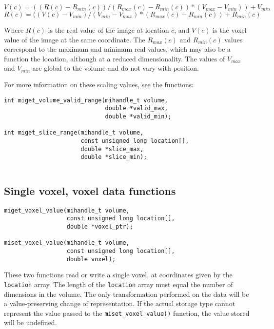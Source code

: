 \documentclass{article}
\begin{document}
\begin{equation}
V(c) = ((R(c) - R_{min}(c)) / (R_{max}(c)-R_{min}(c)) * (V_{max} - V_{min})) + V_{min}
\end{equation}
\begin{equation}
R(c) = ((V(c) - V_{min}) / (V_{min} - V_{max}) * (R_{max}(c) - R_{min}(c)) + R_{min}(c)
\end{equation}

Where $R(c)$ is the real value of the image at location $c$, and
$V(c)$ is the voxel value of the image at the same coordinate.  The
$R_{max}(c)$ and $R_{min}(c)$ values correspond to the maximum and
minimum real values, which may also be a function the location,
although at a reduced dimensionality.  The values of $V_{max}$ and
$V_{min}$ are global to the volume and do not vary with position.

For more information on these scaling values, see the functions:
\begin{verbatim}
int miget_volume_valid_range(mihandle_t volume, 
                             double *valid_max,
                             double *valid_min);

int miget_slice_range(mihandle_t volume,
                      const unsigned long location[],
                      double *slice_max,
                      double *slice_min);
                      
\end{verbatim}

\subsection{Single voxel, voxel data functions}
\begin{verbatim}
miget_voxel_value(mihandle_t volume,
                  const unsigned long location[],
                  double *voxel_ptr);

miset_voxel_value(mihandle_t volume,
                  const unsigned long location[],
                  double voxel);
\end{verbatim}

These two functions read or write a single voxel, at coordinates given
by the {\tt location} array.  The length of the {\tt location} array must
equal the number of dimensions in the volume.  The only transformation
performed on the data will be a value-preserving change of representation.
If the actual storage type cannot represent the value passed to the 
{\tt miset\_voxel\_value()} function, the value stored will be undefined.
\end{document}

